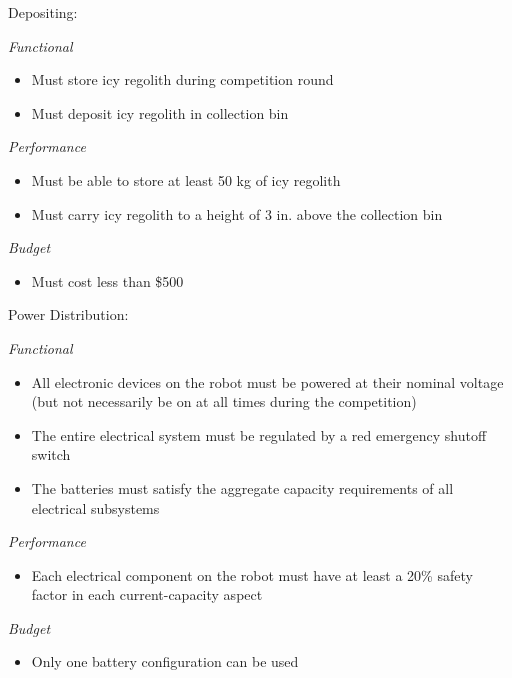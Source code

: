 \documentclass[class=article, crop=false]{standalone}
\begin{document}
\vspace*{0.1in}

\noindent
\normalsize 
Depositing:
\footnotesize

\vspace*{0.05in}
\noindent
\emph{Functional}
\begin{itemize}
 \item Must store icy regolith during competition round
 \item Must deposit icy regolith in collection bin
\end{itemize}
\noindent
\emph{Performance}
\begin{itemize}
 \item Must be able to store at least 50 kg of icy regolith
 \item Must carry icy regolith to a height of 3 in. above the collection bin
\end{itemize}
\noindent
\emph{Budget}
\begin{itemize}
 \item Must cost less than \$500
\end{itemize}

\vspace*{0.1in}

\noindent
\normalsize 
Power Distribution:
\footnotesize

\vspace*{0.05in}
\noindent
\emph{Functional}
\begin{itemize}
 \item All electronic devices on the robot must be powered at their nominal voltage (but not necessarily be on at all times during the competition)
 \item The entire electrical system must be regulated by a red emergency shutoff switch
 \item The batteries must satisfy the aggregate capacity requirements of all electrical subsystems
\end{itemize}
\noindent
\emph{Performance}
\begin{itemize}
 \item Each electrical component on the robot must have at least a 20\% safety factor in each current-capacity aspect
\end{itemize}
\noindent
\emph{Budget}
\begin{itemize}
 \item Only one battery configuration can be used
\end{itemize}

\vspace*{0.1in}
\end{document}

